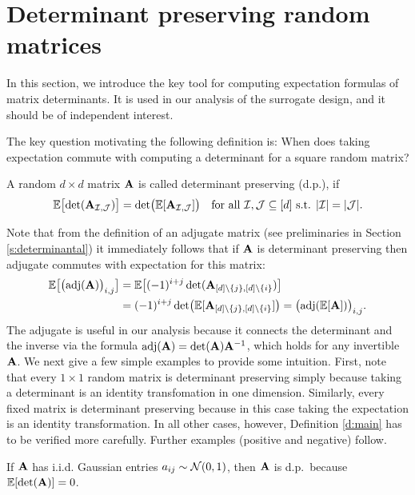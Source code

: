 \documentclass[11pt]{article}
\begin{document}
\section{Determinant preserving random matrices}
\label{s:dp}

In this section, we introduce the key tool for computing expectation formulas of matrix determinants.
It is used in our analysis of the surrogate design, and it should be of independent interest.

The key question motivating the following definition is: When does taking expectation commute with computing a determinant for a square random matrix?
\begin{definition}\label{d:main}
A random $d\times d$ matrix $\mathbf A$ is called determinant
  preserving (d.p.), if
\begin{align*}
  \mathbb E\big[\!\det(\mathbf A_{\mathcal I,\mathcal{J}})\big] =
  \det\!\big(\mathbb E[\mathbf A_{\mathcal I,\mathcal{J}}]\big)\quad \text{for all }\mathcal I,\mathcal{J}\subseteq
  [d]\text{ s.t. }|\mathcal I|=|\mathcal{J}|.
\end{align*}
\end{definition}

\noindent
Note that from the definition of an adjugate matrix (see preliminaries
in Section \ref{s:determinantal}) it immediately follows that if $\mathbf A$ is
determinant preserving then adjugate commutes with expectation for this matrix:
\begin{align}
  \mathbb E\big[\big(\!\operatorname{\textnormal{adj}}(\mathbf A)\big)_{i,j}\big] &=
  \mathbb E\big[(-1)^{i+j}\det(\mathbf A_{[d]\backslash\{j\},[d]\backslash\{i\}})\big]\nonumber
  \\
&=(-1)^{i+j}\det\!\big(\mathbb E[\mathbf A_{[d]\backslash\{j\},[d]\backslash\{i\}}]\big)
  = \big(\!\operatorname{\textnormal{adj}}(\mathbb E[\mathbf A])\big)_{i,j}.\label{eq:adj}
\end{align}
The adjugate is useful in our analysis because it connects the
determinant and the inverse via the formula
$\operatorname{\textnormal{adj}}(\mathbf A)=\det(\mathbf A)\mathbf A^{-1}$, which holds for any invertible $\mathbf A$.
We next give a few simple examples to provide some intuition. First, note
that every $1\times 1$ random matrix is determinant preserving simply
because taking a determinant is an identity transfomation in one
dimension. Similarly, every fixed matrix is determinant preserving because
in this case taking the expectation is an identity
transformation. In all other cases, however, Definition \ref{d:main}
has to be verified more carefully. Further examples (positive and
negative) follow.
\begin{example}
If $\mathbf A$ has i.i.d. Gaussian entries $a_{ij}\sim\mathcal{N}(0,1)$, then
$\mathbf A$ is d.p.~because $\mathbb E[\det(\mathbf A)]=0$.
\end{example}
\end{document}
